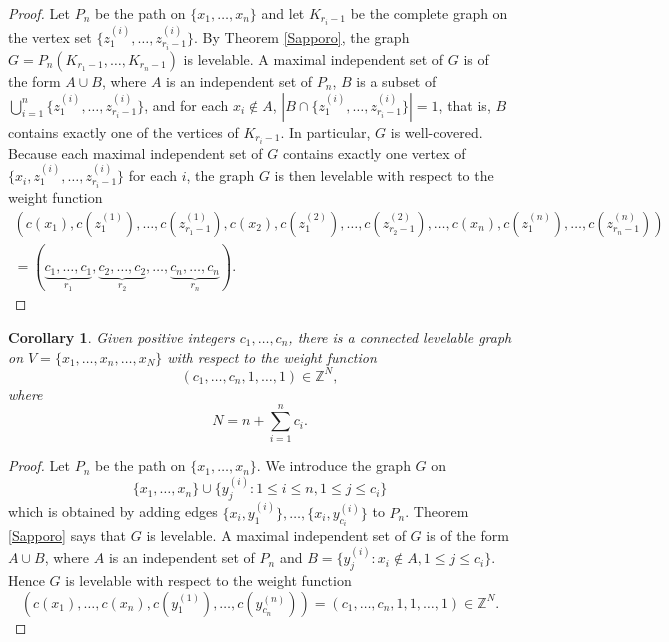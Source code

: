 \documentclass[12pt]{amsart}
\numberwithin{equation}{section}
\newtheorem{corollary}[theorem]{Corollary}
\theoremstyle{definition}
\newtheorem{remark}[theorem]{Remark}
\def\NZQ{\mathbb}               %
\def\ZZ{{\NZQ Z}}
\newcounter{i} %
\begin{document}
\begin{proof}
Let $P_n$ be the path on $\{x_1, \ldots, x_n\}$ and let
$K_{r_i-1}$ be the  complete graph on the vertex set
$\{z_1^{(i)},\ldots,z_{r_i-1}^{(i)}\}$.
By Theorem \ref{Sapporo}, the graph $G = P_n(K_{r_1-1},\ldots,K_{r_n-1})$
is levelable.
A maximal independent set of $G$ is of the form $A \cup B$, 
where $A$ is an independent set of $P_n$, $B$ is a subset
of $\bigcup_{i=1}^n\{z_1^{(i)},\ldots,z_{r_i-1}^{(i)}\}$,
and for each $x_i \not\in A$,  $|B \cap \{z_1^{(i)},\ldots,z_{r_i-1}^{(i)}\}|=1$,
that is, $B$ contains exactly one of the vertices of $K_{r_i-1}$.
In particular, $G$ is well-covered.  Because 
each maximal independent set of $G$ contains exactly
one vertex of $\{x_i,z_1^{(i)},\ldots,z_{r_i-1}^{(i)}\}$ for
each $i$,
the graph $G$ is then levelable with respect to the weight function
\begin{multline*}
(c(x_1), c(z_1^{(1)}),\ldots,c(z_{r_1-1}^{(1)}),c(x_2),
c(z_1^{(2)}),\ldots,c(z_{r_2-1}^{(2)}),\ldots,
c(x_n),
c(z_1^{(n)}),\ldots,c(z_{r_n-1}^{(n)})) \\
= 
(\underbrace{c_1, \ldots,c_1}_{r_1}, \underbrace{c_2, 
\ldots, c_2}_{r_2}, \ldots, \underbrace{c_n, \ldots, c_n}_{r_n}).
\end{multline*}
\end{proof}





\begin{corollary}
\label{cor:BBB}
Given positive integers $c_1, \ldots, c_n$, there is a connected levelable graph on $V=\{x_1, \ldots, x_n, \ldots, x_N\}$ with respect to the weight function
\[
(c_1, \ldots, c_n, 1, \ldots, 1) \in \ZZ^{N},
\]
 where 
\[
N = n + \sum_{i=1}^{n} c_i.
\]
\end{corollary}

\begin{proof}
Let $P_n$ be the path on $\{x_1, \ldots, x_n\}$.  We introduce the graph $G$ on 
\[
\{x_1, \ldots, x_n\} \cup \{y_j^{(i)} : 1 \leq i \leq n, 1 \leq j \leq c_i\}
\]
which is obtained by adding edges $\{x_i, y_1^{(i)}\}, \ldots, \{x_i, y_{c_i}^{(i)}\}$ to $P_n$.  Theorem \ref{Sapporo} says that $G$ is levelable.  A maximal independent set of $G$ is of the form $A \cup B$, where $A$ is an independent set of $P_n$ and $B= \{y_j^{(i)} : x_i \not\in A, 1 \leq j \leq c_i\}$.  Hence $G$ is levelable with respect to the weight function
\[
(c(x_1), \ldots, c(x_n), c(y^{(1)}_1), \ldots, c(y^{(n)}_{c_n})) = (c_1, \ldots, c_n, 1, 1, \ldots, 1) \in \ZZ^N. 
\]
\end{proof}
\end{document}
